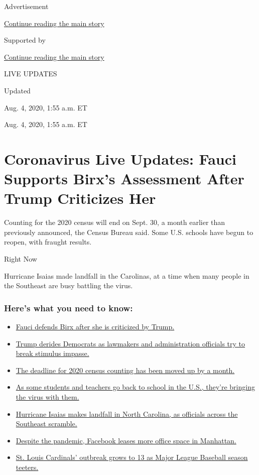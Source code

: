 Advertisement

\protect\hyperlink{after-top}{Continue reading the main story}

Supported by

\protect\hyperlink{after-sponsor}{Continue reading the main story}

LIVE UPDATES

Updated~

Aug. 4, 2020, 1:55 a.m. ET

Aug. 4, 2020, 1:55 a.m. ET

\hypertarget{coronavirus-live-updates-fauci-supports-birxs-assessment-after-trump-criticizes-her}{%
\section{Coronavirus Live Updates: Fauci Supports Birx's Assessment
After Trump Criticizes
Her}\label{coronavirus-live-updates-fauci-supports-birxs-assessment-after-trump-criticizes-her}}

Counting for the 2020 census will end on Sept. 30, a month earlier than
previously announced, the Census Bureau said. Some U.S. schools have
begun to reopen, with fraught results.

Right Now

Hurricane Isaias made landfall in the Carolinas, at a time when many
people in the Southeast are busy battling the virus.

\hypertarget{heres-what-you-need-to-know}{%
\subsubsection{Here's what you need to
know:}\label{heres-what-you-need-to-know}}

\begin{itemize}
\tightlist
\item
  \protect\hyperlink{link-4547638f}{Fauci defends Birx after she is
  criticized by Trump.}
\item
  \protect\hyperlink{link-15e7f995}{Trump derides Democrats as lawmakers
  and administration officials try to break stimulus impasse.}
\item
  \protect\hyperlink{link-e5a2cda}{The deadline for 2020 census counting
  has been moved up by a month.}
\item
  \protect\hyperlink{link-4c85ed64}{As some students and teachers go
  back to school in the U.S., they're bringing the virus with them.}
\item
  \protect\hyperlink{link-5ccc012}{Hurricane Isaias makes landfall in
  North Carolina, as officials across the Southeast scramble.}
\item
  \protect\hyperlink{link-4c7bee27}{Despite the pandemic, Facebook
  leases more office space in Manhattan.}
\item
  \protect\hyperlink{link-43feae1e}{St. Louis Cardinals' outbreak grows
  to 13 as Major League Baseball season teeters.}
\end{itemize}

